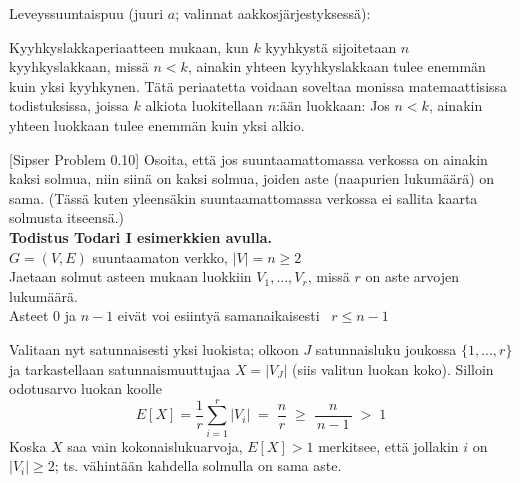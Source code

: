 \documentclass[12pt,a4paper]{article}
\begin{document}
\begin{kohta}
Leveyssuuntaispuu (juuri $a$; valinnat aakkosjärjestyksessä):

\begin{center}
\end{center}


\pagebreak
{}
Kyyhkyslakkaperiaatteen mukaan, kun $k$ kyyhkystä sijoitetaan $n$ kyyhkyslakkaan, missä $n<k$, ainakin yhteen kyyhkyslakkaan tulee enemmän kuin yksi kyyhkynen. Tätä periaatetta voidaan soveltaa monissa matemaattisissa todistuksissa, joissa $k$ alkiota luokitellaan $n$:ään luokkaan: Jos $n<k$, ainakin yhteen luokkaan tulee enemmän kuin yksi alkio.
  
{[Sipser Problem 0.10]}
Osoita, että jos suuntaamattomassa verkossa on ainakin kaksi solmua,
niin siinä on kaksi solmua, joiden aste (naapurien lukumäärä)
on sama.
(Tässä kuten yleensäkin suuntaamattomassa verkossa ei
sallita kaarta solmusta itseensä.)\\



\medskip\noindent
\textbf{Todistus Todari I esimerkkien avulla.}\\

$G=(V,E)$ suuntaamaton verkko, $|V|=n\ge 2$\\

Jaetaan solmut asteen mukaan luokkiin $V_1,...,V_r$, missä $r$ on
aste arvojen lukumäärä. \\
Asteet $0$ ja $n-1$ eivät voi esiintyä samanaikaisesti \Rightarrow \, $r\le n-1$

Valitaan nyt satunnaisesti yksi luokista; olkoon $J$
satunnaisluku joukossa $\{1,...,r\}$ ja tarkastellaan 
satunnaismuuttujaa $X=|V_J|$ (siis valitun luokan koko).
Silloin odotusarvo luokan koolle
\[
E[X]=\frac1r \sum_{i=1}^r |V_i|
\;=\; \frac{n}{r}
\;\ge\; \frac{n}{\,n-1\,} \;>\; 1
\]
Koska $X$ saa vain kokonaislukuarvoja, $E[X]>1$
merkitsee, että jollakin $i$ on $|V_i|\ge 2$;
ts. vähintään kahdella solmulla on sama aste.

\end{kohta}
\end{document}
